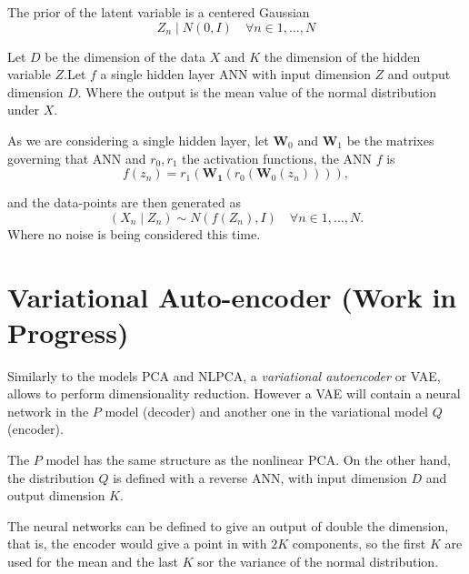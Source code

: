 The prior of the latent variable is a centered Gaussian
\[
  Z_{n} \mid N(0,I) \quad \forall n \in 1,\dots,N
\]

Let \(D\) be the dimension of the data \(X\) and \(K\) the dimension of the hidden variable \(Z\).Let \(f\) a single hidden layer ANN with input dimension \(Z\) and output dimension \(D\). Where the output is the mean value of the normal distribution under \(X\).

As we are considering a single hidden layer, let \(\bm{W}_{0}\) and \(\bm{W}_{1}\) be the matrixes governing that ANN and \(r_{0}, r_{1}\) the activation functions, the ANN \(f\) is
\[
  f(z_{n}) = r_{1}(\bm{W_{1}}(r_{0}(\bm{W}_{0}(z_{n})))),
\]

and the data-points are then generated as
\[
  (X_{n}\mid Z_{n}) \sim N(f(Z_{n}), I) \quad \forall n \in 1,\dots,N.
\]
Where no noise is being considered this time.

\section{Variational Auto-encoder (Work in Progress)}

Similarly to the models PCA and NLPCA, a \emph{variational autoencoder} or VAE, allows to perform dimensionality reduction. However a VAE will contain a neural network in the \(P\)  model (decoder) and another one in the variational model \(Q\) (encoder).

The \(P\) model has the same structure as the nonlinear PCA. On the other hand, the  distribution \(Q\) is defined with a reverse ANN, with input dimension \(D\) and output dimension \(K\).

The neural networks can be defined to give an output of double the dimension, that is, the encoder would give a point in with \( 2K \) components, so the first \( K \) are used for the mean and the last \( K \) sor the variance of the normal distribution.  
